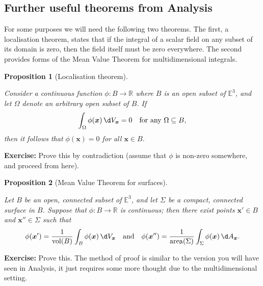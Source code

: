 \documentclass[
  letterpaper,
  DIV=11,
  numbers=noendperiod]{scrreprt}
\theoremstyle{plain}
\newtheorem{proposition}{Proposition}[chapter]
\theoremstyle{remark}
\begin{document}
\subsection{Further useful theorems from
Analysis}\label{further-useful-theorems-from-analysis}

For some purposes we will need the following two theorems. The first, a
localisation theorem, states that if the integral of a scalar field on
any subset of its domain is zero, then the field itself must be zero
everywhere. The second provides forms of the Mean Value Theorem for
multidimensional integrals.

\begin{proposition}[Localisation
theorem]\protect\hypertarget{prp-localisation}{}\label{prp-localisation}

Consider a continuous function \(\phi:B\to{\mathbb{R}}\) where \(B\) is
an open subset of \({\mathbb{E}}^3\), and let \(\Omega\) denote an
arbitrary open subset of \(B\). If
\[\int_\Omega \phi({\boldsymbol{x}}){\,\d V_{{\boldsymbol{x}}}}= 0\quad\text{for any }\Omega\subseteq B,\]
then it follows that \(\phi({\boldsymbol{x}})=0\) for all
\({\boldsymbol{x}}\in B\).

\end{proposition}

\textbf{Exercise:} Prove this by contradiction (assume that \(\phi\) is
non-zero somewhere, and proceed from here).

\begin{proposition}[Mean Value Theorem for
surfaces]\protect\hypertarget{prp-MVTsurfaces}{}\label{prp-MVTsurfaces}

Let \(B\) be an open, connected subset of \({\mathbb{E}}^3\), and let
\(\Sigma\) be a compact, connected surface in \(B\). Suppose that
\(\phi:B\to{\mathbb{R}}\) is continuous; then there exist points
\({\boldsymbol{x}}'\in B\) and \({\boldsymbol{x}}''\in\Sigma\) such that
\[\phi({\boldsymbol{x}}') = \frac{1}{{\operatorname{vol}}(B)}\int_B \phi({\boldsymbol{x}}){\,\d V_{{\boldsymbol{x}}}}\quad\text{and}\quad
    \phi({\boldsymbol{x}}'') = \frac{1}{{\operatorname{area}}(\Sigma)}\int_\Sigma \phi({\boldsymbol{x}}){\,\d A_{{\boldsymbol{x}}}}.\]

\end{proposition}

\textbf{Exercise:} Prove this. The method of proof is similar to the
version you will have seen in Analysis, it just requires some more
thought due to the multidimensional setting.
\end{document}
